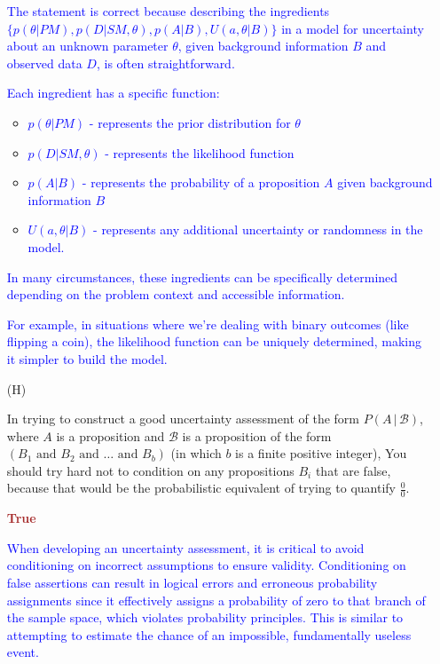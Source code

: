 \documentclass[12pt]{article}
\newcommand{\given}{\, | \,}
\begin{document}
\begin{itemize}
\textcolor{blue}{The statement is correct because describing the ingredients $\{p(\theta | PM), p(D | SM, \theta), p(A | B), U(a, \theta | B)\}$ in a model for uncertainty about an unknown parameter $\theta$, given background information $B$ and observed data $D$, is often straightforward.}

\textcolor{blue}{Each ingredient has a specific function:}
\begin{itemize}
    \item \textcolor{blue}{$p(\theta | PM)$ - represents the prior distribution for $\theta$}
    \item \textcolor{blue}{$p(D | SM, \theta)$ - represents the likelihood function}
    \item \textcolor{blue}{$p(A | B)$ - represents the probability of a proposition $A$ given background information $B$}
    \item \textcolor{blue}{$U(a, \theta | B)$ - represents any additional uncertainty or randomness in the model.}
\end{itemize}

\textcolor{blue}{In many circumstances, these ingredients can be specifically determined depending on the problem context and accessible information.}

\textcolor{blue}{For example, in situations where we're dealing with binary outcomes (like flipping a coin), the likelihood function can be uniquely determined, making it simpler to build the model.}


\item[(H)]

In trying to construct a good uncertainty assessment of the form $P ( A \given
\mathcal B )$, where $A$ is a proposition and $\mathcal B$ is a proposition
of the form $( B_1 \textrm{ and } B_2 \textrm{ and } \dots \textrm{ and }
B_b )$ (in which $b$ is a finite positive integer), You should try hard not to condition on any propositions $B_i$ that are false, because that would be the probabilistic equivalent of trying to quantify $\frac{ 0 }{ 0 }$.  

\textcolor{brown}{\textbf{True}}

\textcolor{blue}{When developing an uncertainty assessment, it is critical to avoid conditioning on incorrect assumptions to ensure validity. Conditioning on false assertions can result in logical errors and erroneous probability assignments since it effectively assigns a probability of zero to that branch of the sample space, which violates probability principles. This is similar to attempting to estimate the chance of an impossible, fundamentally useless event.}


\end{itemize}
\end{document}
